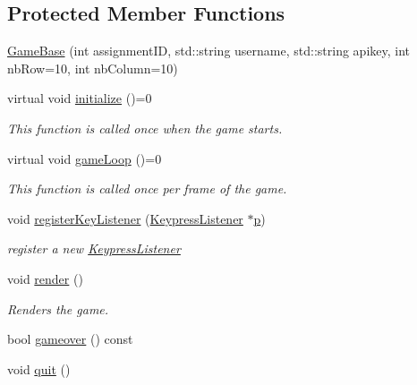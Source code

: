 \subsection*{Protected Member Functions}
\begin{DoxyCompactItemize}
\item 
\mbox{\hyperlink{classbridges_1_1game_1_1_game_base_abd73825c57a10d28191a3f1162eb9bd8}{Game\+Base}} (int assignment\+ID, std\+::string username, std\+::string apikey, int nb\+Row=10, int nb\+Column=10)
\item 
virtual void \mbox{\hyperlink{classbridges_1_1game_1_1_game_base_a9b6eb6fa7fceaac09d204b549164037f}{initialize}} ()=0
\begin{DoxyCompactList}\small\item\em This function is called once when the game starts. \end{DoxyCompactList}\item 
virtual void \mbox{\hyperlink{classbridges_1_1game_1_1_game_base_a16fb787bc65be1a582cddcfba3a0c5bb}{game\+Loop}} ()=0
\begin{DoxyCompactList}\small\item\em This function is called once per frame of the game. \end{DoxyCompactList}\item 
void \mbox{\hyperlink{classbridges_1_1game_1_1_game_base_a9612e74fe407127cae8455a0e34b5662}{register\+Key\+Listener}} (\mbox{\hyperlink{classbridges_1_1game_1_1_keypress_listener}{Keypress\+Listener}} $\ast$\mbox{\hyperlink{namespacebridges_1_1game_ab9a19c7ab6e2ebac2f95180e21733487a83878c91171338902e0fe0fb97a8c47a}{p}})
\begin{DoxyCompactList}\small\item\em register a new \mbox{\hyperlink{classbridges_1_1game_1_1_keypress_listener}{Keypress\+Listener}} \end{DoxyCompactList}\item 
void \mbox{\hyperlink{classbridges_1_1game_1_1_game_base_ac042479b1d1cf87b8ea7c8884d5326b6}{render}} ()
\begin{DoxyCompactList}\small\item\em Renders the game. \end{DoxyCompactList}\item 
bool \mbox{\hyperlink{classbridges_1_1game_1_1_game_base_adbc9759ea7995f2ee224e9b85d798f2f}{gameover}} () const
\item 
void \mbox{\hyperlink{classbridges_1_1game_1_1_game_base_a78d8bdc86cf7c5aba6a75879be1b6140}{quit}} ()

\end{DoxyCompactItemize}
